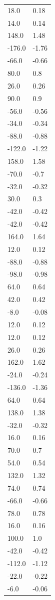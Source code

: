 \begin{longtable}{ll}
18.0 & 0.18 \\
14.0 & 0.14 \\
148.0 & 1.48 \\
-176.0 & -1.76 \\
-66.0 & -0.66 \\
80.0 & 0.8 \\
26.0 & 0.26 \\
90.0 & 0.9 \\
-56.0 & -0.56 \\
-34.0 & -0.34 \\
-88.0 & -0.88 \\
-122.0 & -1.22 \\
158.0 & 1.58 \\
-70.0 & -0.7 \\
-32.0 & -0.32 \\
30.0 & 0.3 \\
-42.0 & -0.42 \\
-42.0 & -0.42 \\
164.0 & 1.64 \\
12.0 & 0.12 \\
-88.0 & -0.88 \\
-98.0 & -0.98 \\
64.0 & 0.64 \\
42.0 & 0.42 \\
-8.0 & -0.08 \\
12.0 & 0.12 \\
12.0 & 0.12 \\
26.0 & 0.26 \\
162.0 & 1.62 \\
-24.0 & -0.24 \\
-136.0 & -1.36 \\
64.0 & 0.64 \\
138.0 & 1.38 \\
-32.0 & -0.32 \\
16.0 & 0.16 \\
70.0 & 0.7 \\
54.0 & 0.54 \\
132.0 & 1.32 \\
74.0 & 0.74 \\
-66.0 & -0.66 \\
78.0 & 0.78 \\
16.0 & 0.16 \\
100.0 & 1.0 \\
-42.0 & -0.42 \\
-112.0 & -1.12 \\
-22.0 & -0.22 \\
-6.0 & -0.06 \\

\end{longtable}
